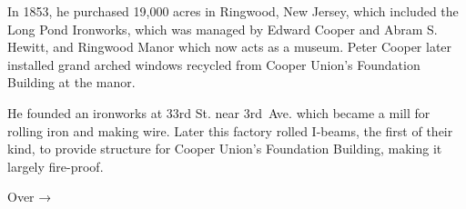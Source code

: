 \documentclass{article}
\begin{document}
\begin{minipage}[t]{0.46\linewidth}
\begin{enumList}
\item In 1853, he purchased 19,000 acres in Ringwood, New Jersey, which
included the {\mdseries Long Pond Ironworks}, which was managed by Edward
Cooper and Abram S. Hewitt, and {\mdseries Ringwood Manor} which now acts as a
museum. Peter Cooper later installed {\mdseries grand arched windows recycled
from Cooper Union's Foundation Building} at the manor.

\item He founded an ironworks at 33rd St. near 3rd~Ave. which became a mill
for rolling iron and making wire. Later this factory {\mdseries rolled
I-beams}, the first of their kind, to provide structure for {\mdseries Cooper
Union's Foundation Building}, making it largely {\mdseries fire-proof}.

\setcounter{enumTemp}{\value{enumListi}}
\end{enumList}
\end{minipage}
\vspace*{\fill}

\hfill Over { →}

\newpage{}
\end{document}

